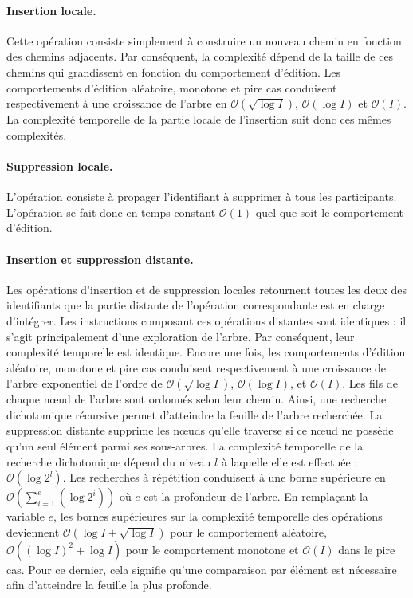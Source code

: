 \paragraph{Insertion locale.} Cette opération consiste simplement à construire
un nouveau chemin en fonction des chemins adjacents. Par conséquent, la
complexité dépend de la taille de ces chemins qui grandissent en fonction du
comportement d'édition. Les comportements d'édition aléatoire, monotone et pire
cas conduisent respectivement à une croissance de l'arbre en
$\mathcal{O}(\sqrt{\log I})$, $\mathcal{O}(\log I)$ et $\mathcal{O}(I)$. La
complexité temporelle de la partie locale de l'insertion suit donc ces mêmes
complexités.

\paragraph{Suppression locale.} L'opération consiste à propager l'identifiant à
supprimer à tous les participants. L'opération se fait donc en temps constant
$\mathcal{O}(1)$ quel que soit le comportement d'édition.

\paragraph{Insertion et suppression distante.} Les opérations d'insertion et de
suppression locales retournent toutes les deux des identifiants que la partie
distante de l'opération correspondante est en charge d'intégrer.  Les
instructions composant ces opérations distantes sont identiques : il s'agit
principalement d'une exploration de l'arbre. Par conséquent, leur complexité
temporelle est identique. Encore une fois, les comportements d'édition
aléatoire, monotone et pire cas conduisent respectivement à une croissance de
l'arbre exponentiel de l'ordre de $\mathcal{O}(\sqrt{\log I})$,
$\mathcal{O}(\log I)$, et $\mathcal{O}(I)$.  Les fils de chaque nœud de l'arbre
sont ordonnés selon leur chemin. Ainsi, une recherche dichotomique récursive
permet d'atteindre la feuille de l'arbre recherchée. La suppression distante
supprime les nœuds qu'elle traverse si ce nœud ne possède qu'un seul élément
parmi ses sous-arbres. La complexité temporelle de la recherche dichotomique
dépend du niveau $l$ à laquelle elle est effectuée : $\mathcal{O}(\log 2^l)$.
Les recherches à répétition conduisent à une borne supérieure en
$\mathcal{O}(\textstyle\sum\nolimits_{i=1}^{e}(\log 2^i))$ où $e$ est la
profondeur de l'arbre. En remplaçant la variable $e$, les bornes supérieures sur
la complexité temporelle des opérations deviennent
$\mathcal{O}(\log I + \sqrt{\log I})$ pour le comportement aléatoire,
$\mathcal{O}((\log I)^2 + \log I)$ pour le comportement monotone et
$\mathcal{O}(I)$ dans le pire cas. Pour ce dernier, cela signifie qu'une
comparaison par élément est nécessaire afin d'atteindre la feuille la plus
profonde.

